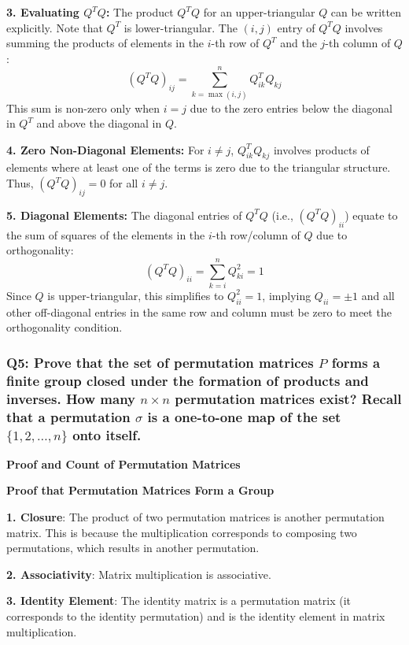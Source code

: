 \documentclass{article}
\begin{document}
\textbf{3. Evaluating \( Q^TQ \):}
   The product \( Q^TQ \) for an upper-triangular \( Q \) can be written explicitly. Note that \( Q^T \) is lower-triangular. The \( (i, j) \) entry of \( Q^TQ \) involves summing the products of elements in the \( i \)-th row of \( Q^T \) and the \( j \)-th column of \( Q \):
   \[
   (Q^TQ)_{ij} = \sum_{k=\max(i,j)}^n Q^T_{ik}Q_{kj}
   \]
   This sum is non-zero only when \( i = j \) due to the zero entries below the diagonal in \( Q^T \) and above the diagonal in \( Q \).

\textbf{4. Zero Non-Diagonal Elements:}
   For \( i \neq j \), \( Q^T_{ik}Q_{kj} \) involves products of elements where at least one of the terms is zero due to the triangular structure. Thus, \( (Q^TQ)_{ij} = 0 \) for all \( i \neq j \).

\textbf{5. Diagonal Elements:}
   The diagonal entries of \( Q^TQ \) (i.e., \( (Q^TQ)_{ii} \)) equate to the sum of squares of the elements in the \( i \)-th row/column of \( Q \) due to orthogonality:
   \[
   (Q^TQ)_{ii} = \sum_{k=i}^n Q_{ki}^2 = 1
   \]
   Since \( Q \) is upper-triangular, this simplifies to \( Q_{ii}^2 = 1 \), implying \( Q_{ii} = \pm 1 \) and all other off-diagonal entries in the same row and column must be zero to meet the orthogonality condition.


\subsubsection*{Q5: Prove that the set of permutation matrices \(P\) forms a finite group closed under the formation of products and inverses. How many \(n \times n\) permutation matrices exist? Recall that a permutation \(\sigma\) is a one-to-one map of the set \(\{1, 2, \ldots, n\}\) onto itself.}

\textbf{Proof and Count of Permutation Matrices}

\textbf{Proof that Permutation Matrices Form a Group}

\textbf{1. Closure}: The product of two permutation matrices is another permutation matrix. This is because the multiplication corresponds to composing two permutations, which results in another permutation.

\textbf{2. Associativity}: Matrix multiplication is associative.

\textbf{3. Identity Element}: The identity matrix is a permutation matrix (it corresponds to the identity permutation) and is the identity element in matrix multiplication.
\end{document}
